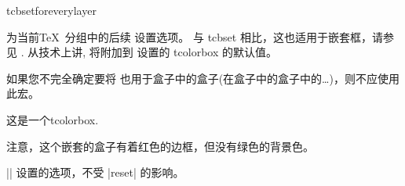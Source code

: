 \begin{docCommand}{tcbsetforeverylayer}{}

  为当前\TeX\ 分组中的后续  设置选项。
  与 tcbset 相比，这也适用于嵌套框，请参见 .
  从技术上讲,   将附加到  设置的 tcolorbox 的默认值。\par

    

  如果您不完全确定要将  也用于盒子中的盒子(在盒子中的盒子中的\ldots)，则不应使用此宏。
\begin{dispExample}

\begin{tcolorbox}[title=All options for this box]
这是一个tcolorbox.\par\medskip
  \begin{tcolorbox}[title=嵌套的盒子]
    注意，这个嵌套的盒子有着红色的边框，但没有绿色的背景色。
  \end{tcolorbox}
\end{tcolorbox}
\bigskip

\begin{tcolorbox}[reset]
|\tcbsetforeverylayer| 设置的选项，不受 |reset| 的影响。
\end{tcolorbox}
\end{dispExample}
\end{docCommand}


